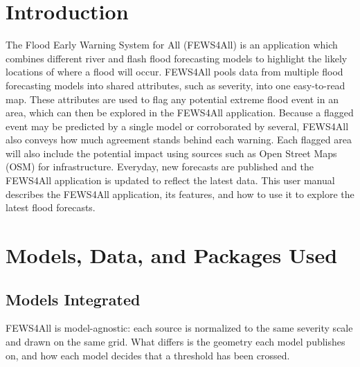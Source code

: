%

\section*{Introduction}\label{introduction}

The Flood Early Warning System for All (FEWS4All) is an application which combines different river and flash flood forecasting models to highlight the likely locations of where a flood will occur.
FEWS4All pools data from multiple flood forecasting models into shared attributes, such as severity, into one easy-to-read map.
These attributes are used to flag any potential extreme flood event in an area, which can then be explored in the FEWS4All application.
Because a flagged event may be predicted by a single model or corroborated by several, FEWS4All also conveys how much agreement stands behind each warning.
Each flagged area will also include the potential impact using sources such as Open Street Maps (OSM) for infrastructure.
Everyday, new forecasts are published and the FEWS4All application is updated to reflect the latest data.
This user manual describes the FEWS4All application, its features, and how to use it to explore the latest flood forecasts.


\section{Models, Data, and Packages Used}\label{models-data-and-packages-used}

\subsection{Models Integrated}\label{models-integrated}

FEWS4All is model-agnostic: each source is normalized to the same severity scale and drawn on the same grid.
What differs is the geometry each model publishes on, and how each model decides that a threshold has been crossed.

